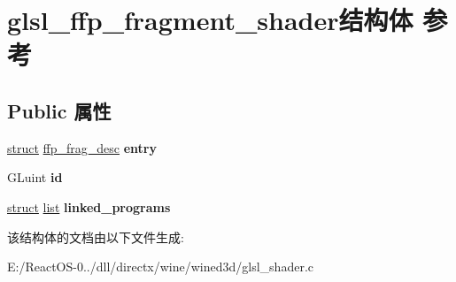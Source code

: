 \hypertarget{structglsl__ffp__fragment__shader}{}\section{glsl\+\_\+ffp\+\_\+fragment\+\_\+shader结构体 参考}
\label{structglsl__ffp__fragment__shader}
\subsection*{Public 属性}
\begin{DoxyCompactItemize}
\item 
\mbox{\label{structglsl__ffp__fragment__shader_a623ec50dd9f09cd8ac1bb74725d6d2f9}} 
\hyperlink{interfacestruct}{struct} \hyperlink{structffp__frag__desc}{ffp\+\_\+frag\+\_\+desc} {\bfseries entry}
\item 
\mbox{\label{structglsl__ffp__fragment__shader_a2a2203ea05fd85380fc36d222e56892f}} 
G\+Luint {\bfseries id}
\item 
\mbox{\label{structglsl__ffp__fragment__shader_af0aa90faf2b3fcaef796da96417fa7d6}} 
\hyperlink{interfacestruct}{struct} \hyperlink{classlist}{list} {\bfseries linked\+\_\+programs}
\end{DoxyCompactItemize}


该结构体的文档由以下文件生成\+:\begin{DoxyCompactItemize}
\item 
E\+:/\+React\+O\+S-\/0../dll/directx/wine/wined3d/glsl\+\_\+shader.\+c\end{DoxyCompactItemize}
